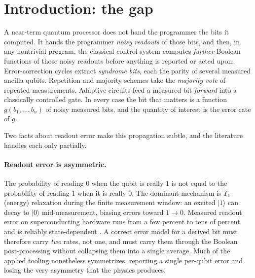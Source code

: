 \documentclass[a4paper,onecolumn,unpublished,nopdfoutputerror,allowtoday]{quantumarticle}
\numberwithin{equation}{section}
\theoremstyle{plain}
\theoremstyle{definition}
\theoremstyle{remark}
\newcommand{\ket}[1]{\lvert #1 \rangle}
\begin{document}
\section{Introduction: the gap}
\label{sec:intro}

A near-term quantum processor does not hand the programmer the bits it computed.
It hands the programmer \emph{noisy readouts} of those bits, and then, in any
nontrivial program, the classical control system computes \emph{further}
Boolean functions of those noisy readouts before anything is reported or acted
upon. Error-correction cycles extract \emph{syndrome bits}, each the parity of
several measured ancilla qubits. Repetition and majority schemes take the
\emph{majority vote} of repeated measurements. Adaptive circuits feed a measured
bit \emph{forward} into a classically controlled gate. In every case the bit
that matters is a function $g(b_1,\dots,b_n)$ of noisy measured bits, and the
quantity of interest is the error rate of $g$.

Two facts about readout error make this propagation subtle, and the literature
handles each only partially.

\paragraph{Readout error is asymmetric.} The probability of reading $0$ when the
qubit is really $1$ is not equal to the probability of reading $1$ when it is
really $0$. The dominant mechanism is $T_1$ (energy) relaxation during the finite
measurement window: an excited $\ket{1}$ can decay to $\ket{0}$ mid-measurement,
biasing errors toward $1\!\to\!0$. Measured readout error on superconducting
hardware runs from a few percent to tens of percent and is reliably
state-dependent \citep{tannu2019mitigating,hicks2021readout}. A correct error
model for a derived bit must therefore carry \emph{two} rates, not one, and must
carry them through the Boolean post-processing without collapsing them into a
single average. Much of the applied tooling nonetheless symmetrizes, reporting a
single per-qubit error and losing the very asymmetry that the physics produces.
\end{document}
